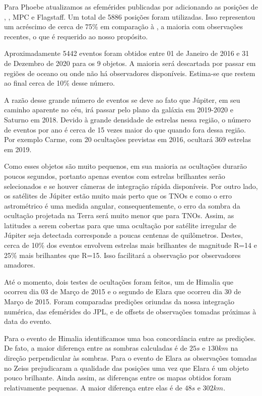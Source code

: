 \documentclass[12pt,a4paper]{report}
\begin{document}
Para Phoebe atualizamos as efemérides publicadas por \cite{Desmars2013} adicionando as posições de \cite{GomesJunior2015-Irregular}, \cite{Peng2015}, MPC e Flagstaff. Um total de 5886 posições foram utilizadas. Isso representou um acréscimo de cerca de 75\% em comparação à \cite{Desmars2013}, a maioria com observações recentes, o que é requerido ao nosso propósito.

Aproximadamente 5442 eventos foram obtidos entre 01 de Janeiro de 2016 e 31 de Dezembro de 2020 para os 9 objetos. A maioria será descartada por passar em regiões de oceano ou onde não há observadores disponíveis. Estima-se que restem ao final cerca de 10\% desse número.

A razão desse grande número de eventos se deve ao fato que Júpiter, em seu caminho aparente no céu, irá passar pelo plano da galáxia em 2019-2020 e Saturno em 2018. Devido à grande densidade de estrelas nessa região, o número de eventos por ano é cerca de 15 vezes maior do que quando fora dessa região. Por exemplo Carme, com 20 ocultações previstas em 2016, ocultará 369 estrelas em 2019.

Como esses objetos são muito pequenos, em sua maioria as ocultações durarão poucos segundos, portanto apenas eventos com estrelas brilhantes serão selecionados e se houver câmeras de integração rápida disponíveis. Por outro lado, os satélites de Júpiter estão muito mais perto que os TNOs e como o erro astrométrico é uma medida angular, consequentemente, o erro da sombra da ocultação projetada na Terra será muito menor que para TNOs. Assim, as latitudes a serem cobertas para que uma ocultação por satélite irregular de Júpiter seja detectada corresponde a poucas centenas de quilômetros. Destes, cerca de 10\% dos eventos envolvem estrelas mais brilhantes de magnitude R=14 e 25\% mais brilhantes que R=15. Isso facilitará a observação por observadores amadores.

Até o momento, dois testes de ocultações foram feitos, um de Himalia que ocorreu dia 03 de Março de 2015 e o segundo de Elara que ocorreu dia 30 de Março de 2015. Foram comparadas predições oriundas da nossa integração numérica, das efemérides do JPL, e de offsets de observações tomadas próximas à data do evento.

Para o evento de Himalia identificamos uma boa concordância entre as predições. De fato, a maior diferença entre as sombras calculadas é de $25 s$ e $130 km$ na direção perpendicular às sombras. Para o evento de Elara as observações tomadas no Zeiss prejudicaram a qualidade das posições uma vez que Elara é um objeto pouco brilhante. Ainda assim, as diferenças entre os mapas obtidos foram relativamente pequenas. A maior diferença entre elas é de $48 s$ e $302 km$.
\end{document}
